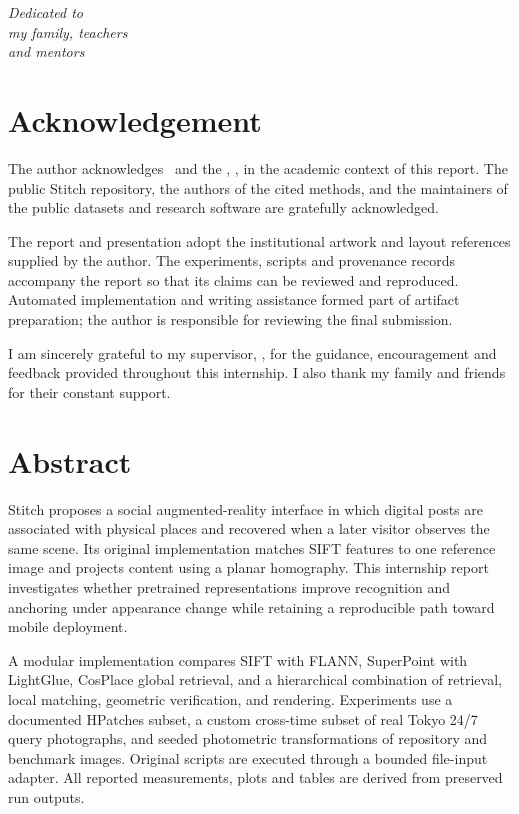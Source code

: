 \thispagestyle{plain}\null\vfill
\begin{flushright}\Large\itshape
Dedicated to\\[6pt]
my family, teachers\\[6pt]
and mentors
\end{flushright}
\vspace{2cm}\clearpage

\chapter*{Acknowledgement}
The author acknowledges \SupervisorName\ and the \SchoolName, \InstituteName, in the academic
context of this report. The public Stitch repository, the authors of the cited methods, and the
maintainers of the public datasets and research software are gratefully acknowledged.

The report and presentation adopt the institutional artwork and layout references supplied by the
author. The experiments, scripts and provenance records accompany the report so that its
claims can be reviewed and reproduced. Automated implementation and writing assistance formed
part of artifact preparation; the author is responsible for reviewing the final submission.

I am sincerely grateful to my supervisor, \SupervisorName, for the guidance, encouragement and
feedback provided throughout this internship. I also thank my family and friends for their
constant support.
\clearpage

\chapter*{Abstract}
Stitch proposes a social augmented-reality interface in which digital posts are associated with
physical places and recovered when a later visitor observes the same scene. Its original
implementation matches SIFT features to one reference image and projects content using a planar
homography. This internship report investigates whether pretrained representations improve recognition and
anchoring under appearance change while retaining a reproducible path toward mobile deployment.

A modular implementation compares SIFT with FLANN, SuperPoint with LightGlue, CosPlace global
retrieval, and a hierarchical combination of retrieval, local matching, geometric verification,
and rendering. Experiments use a documented HPatches subset, a custom cross-time subset of real
Tokyo 24/7 query photographs, and seeded photometric transformations of repository and benchmark
images. Original scripts are executed through a bounded file-input adapter. All reported
measurements, plots and tables are derived from preserved run outputs.

